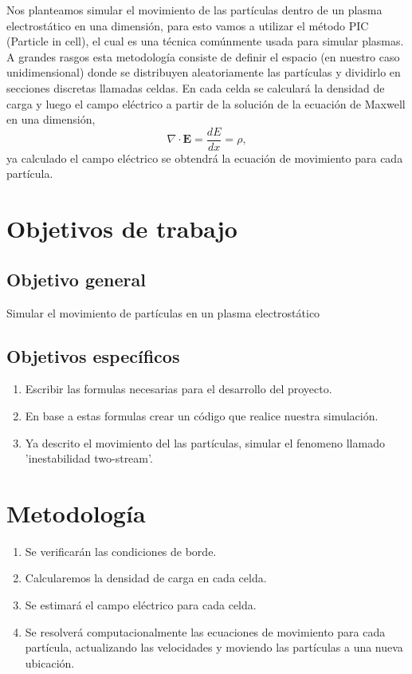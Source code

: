 \documentclass{article}
\begin{document}
		Nos planteamos simular el movimiento de las partículas dentro de un plasma electrostático en una dimensión, para esto vamos a utilizar el método PIC (Particle in cell), el cual es una técnica comúnmente usada para simular plasmas. A grandes rasgos esta metodología consiste de definir el espacio (en nuestro caso unidimensional) donde se distribuyen aleatoriamente las partículas y dividirlo en secciones discretas llamadas celdas. En cada celda se calculará la densidad de carga y luego el campo eléctrico a partir de la solución de la ecuación de Maxwell en una dimensión,
	\begin{equation}
		\nabla \cdot \mathbf{E} = \frac{dE}{dx} = \rho,
	\end{equation}
	ya calculado el campo eléctrico se obtendrá la ecuación de movimiento para cada partícula.
	
	\section{Objetivos de trabajo}
	
	\subsection{Objetivo general}
	
	Simular el movimiento de partículas en un plasma electrostático
	
	\subsection{Objetivos específicos}
	\begin{enumerate}
		\item Escribir las formulas necesarias para el desarrollo del proyecto.
		\item En base a estas formulas crear un código que realice nuestra simulación.
		\item Ya descrito el movimiento del las partículas, simular el fenomeno llamado 'inestabilidad two-stream'.
	\end{enumerate}
	
	\section{Metodología}
	
	\begin{enumerate}
		\item Se verificarán las condiciones de borde.
		\item Calcularemos la densidad de carga en cada celda.
		\item Se estimará el campo eléctrico para cada celda.
		\item Se resolverá computacionalmente las ecuaciones de movimiento para cada partícula, actualizando las velocidades y moviendo las partículas a una nueva ubicación.
	\end{enumerate}
	
\end{document}
